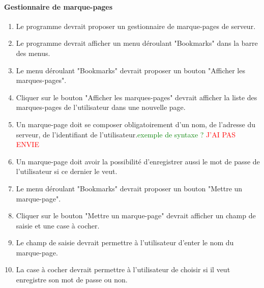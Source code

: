 \documentclass[10pt,a4paper]{report}
\begin{document}
\paragraph{Gestionnaire de marque-pages}
	\begin{enumerate}
		\item Le programme devrait proposer un gestionnaire de marque-pages de serveur.
		\item Le programme devrait afficher un menu déroulant "Bookmarks" dans la barre des menus.
		\item Le menu déroulant "Bookmarks" devrait proposer un bouton "Afficher les marques-pages".
		\item Cliquer sur le bouton "Afficher les marques-pages" devrait afficher la liste des marques-pages de l'utilisateur dans une nouvelle page.
		\item Un marque-page doit se composer obligatoirement d'un nom, de l'adresse du serveur, de l'identifiant de l'utilisateur.\textcolor{green}{exemple de syntaxe ?} \textcolor{red}{J'AI PAS ENVIE}
		\item Un marque-page doit avoir la possibilité d'enregistrer aussi le mot de passe de l'utilisateur si ce dernier le veut.
		\item Le menu déroulant "Bookmarks" devrait proposer un bouton "Mettre un marque-page".
		\item Cliquer sur le bouton "Mettre un marque-page" devrait afficher un champ de saisie et une case à cocher.
		\item Le champ de saisie devrait permettre à l'utilisateur d'enter le nom du marque-page.
		\item La case à cocher devrait permettre à l'utilisateur de choisir si il veut enregistre son mot de passe ou non.
	\end{enumerate}
	
\end{document}
